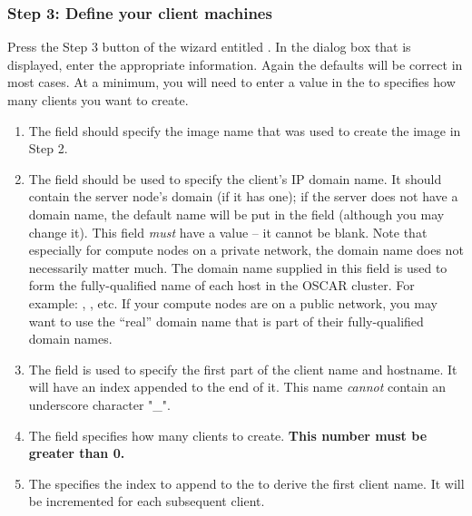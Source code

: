 
\subsubsection{Step 3: Define your client machines} 
\label{det:defclients}

Press the Step 3 button of the wizard entitled . In the dialog box that is displayed, enter the appropriate
information. Again the defaults will be correct in most cases. At a
minimum, you will need to enter a value in the 
to specifies how many clients you want to create.

\begin{enumerate}
  
\item The  field should specify the image name that
  was used to create the image in Step 2.
  
\item The  field should be used to specify the
  client's IP domain name.  
%
  It should contain the server node's domain (if it has one); if the
  server does not have a domain name, the default name
   will be put in the field (although you may
  change it).
%
  This field \emph{must} have a value -- it cannot be blank.
%
  Note that especially for compute nodes on a private network, the
  domain name does not necessarily matter much.  The domain name
  supplied in this field is used to form the fully-qualified name of
  each host in the OSCAR cluster.  For example:
  ,
  , etc.  If your compute nodes are
  on a public network, you may want to use the ``real'' domain name
  that is part of their fully-qualified domain names.

\item The  field is used to specify the first part of
  the client name and hostname. It will have an index appended to the
  end of it. This name \emph{cannot} contain an underscore 
  character "\_".

\item The  field specifies how many clients to
  create.  {\bf This number must be greater than 0.}
  
\item The  specifies the index to append to the
   to derive the first client name. It will be
  incremented for each subsequent client.


\end{enumerate}
